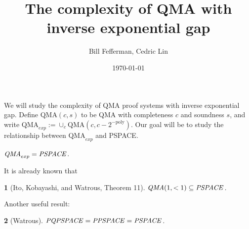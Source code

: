 \documentclass[english]{article}
\numberwithin{equation}{section}
\numberwithin{figure}{section}
\theoremstyle{plain}
\newtheorem{thm}{\protect\theoremname}
\theoremstyle{definition}
\theoremstyle{plain}
\theoremstyle{definition}
\theoremstyle{remark}
\theoremstyle{remark}
\theoremstyle{plain}
\providecommand{\theoremname}{Theorem}
\begin{document}
\title{The complexity of QMA with inverse exponential gap}
\author{Bill Fefferman, Cedric Lin}
\date{\today}
\maketitle
%

We will study the complexity of QMA proof systems with inverse exponential gap. Define $\text{QMA}(c,s)$ to be QMA with completeness $c$ and soundness $s$, and write $\text{QMA}_{exp} := \cup_{c}\text{QMA}(c,c-2^{-\text{poly}})$. Our goal  will be to study the relationship between $\text{QMA}_{exp}$ and PSPACE.

\begin{con}
$\text{\emph{QMA}}_{exp}=\text{\emph{PSPACE}}$.
\end{con}

It is already known that
\begin{thm}[Ito, Kobayashi, and Watrous, Theorem 11] 
$\text{\emph{QMA}}(1,<1)\subseteq\text{\emph{PSPACE}}$.
\end{thm}
Another useful result:
\begin{thm}[Watrous]
$\text{\emph{PQPSPACE}} = \text{\emph{PPSPACE}} = \text{\emph{PSPACE}} $.
\end{thm}
\end{document}
